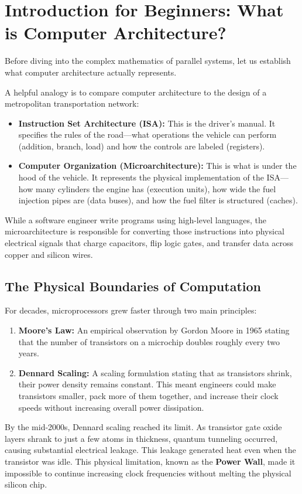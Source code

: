 \documentclass[12pt,a4paper,openany]{book}
\begin{document}
\section{Introduction for Beginners: What is Computer Architecture?}
Before diving into the complex mathematics of parallel systems, let us establish what computer architecture actually represents.

A helpful analogy is to compare computer architecture to the design of a metropolitan transportation network:
\begin{itemize}
    \item \textbf{Instruction Set Architecture (ISA):} This is the driver's manual. It specifies the rules of the road—what operations the vehicle can perform (addition, branch, load) and how the controls are labeled (registers).
    \item \textbf{Computer Organization (Microarchitecture):} This is what is under the hood of the vehicle. It represents the physical implementation of the ISA—how many cylinders the engine has (execution units), how wide the fuel injection pipes are (data buses), and how the fuel filter is structured (caches).
\end{itemize}

While a software engineer write programs using high-level languages, the microarchitecture is responsible for converting those instructions into physical electrical signals that charge capacitors, flip logic gates, and transfer data across copper and silicon wires.

\subsection{The Physical Boundaries of Computation}
For decades, microprocessors grew faster through two main principles:
\begin{enumerate}
    \item \textbf{Moore's Law:} An empirical observation by Gordon Moore in 1965 stating that the number of transistors on a microchip doubles roughly every two years.
    \item \textbf{Dennard Scaling:} A scaling formulation stating that as transistors shrink, their power density remains constant. This meant engineers could make transistors smaller, pack more of them together, and increase their clock speeds without increasing overall power dissipation.
\end{enumerate}

By the mid-2000s, Dennard scaling reached its limit. As transistor gate oxide layers shrank to just a few atoms in thickness, quantum tunneling occurred, causing substantial electrical leakage. This leakage generated heat even when the transistor was idle. This physical limitation, known as the \textbf{Power Wall}, made it impossible to continue increasing clock frequencies without melting the physical silicon chip.
\end{document}
